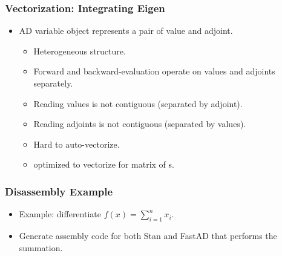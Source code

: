 \begin{frame}
\frametitle{Vectorization: Integrating Eigen} 
\begin{itemize}

\item AD variable object represents a pair of value and adjoint.
    \begin{itemize}
        \item Heterogeneous structure.
        \item Forward and backward-evaluation operate 
            on values and adjoints separately.
        \item Reading values is not contiguous (separated by adjoint).
        \item Reading adjoints is not contiguous (separated by values).
        \item Hard to auto-vectorize.
        \item {} optimized to vectorize for matrix of s.
    \end{itemize}

\end{itemize}
\end{frame}

\begin{frame}
\frametitle{Disassembly Example}

\begin{itemize}

\item Example: differentiate $f(x) = \sum\limits_{i=1}^n x_i$.

\item Generate assembly code for both Stan and FastAD that performs the summation.

\end{itemize}
\end{frame}

